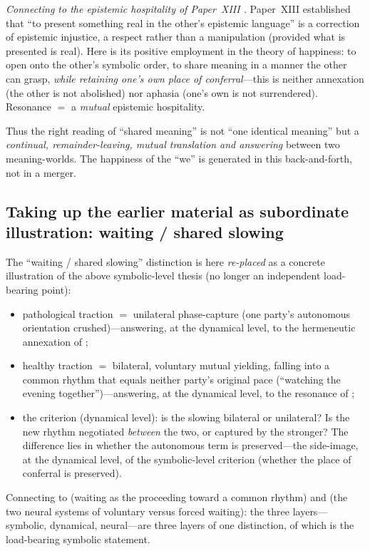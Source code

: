\emph{Connecting to the epistemic hospitality of Paper~XIII \parencite{paperxiii}.} Paper~XIII established that ``to present something real in the other's epistemic language'' is a correction of epistemic injustice, a respect rather than a manipulation (provided what is presented is real). Here is its positive employment in the theory of happiness: to open onto the other's symbolic order, to share meaning in a manner the other can grasp, \emph{while retaining one's own place of conferral}---this is neither annexation (the other is not abolished) nor aphasia (one's own is not surrendered). Resonance $=$ a \emph{mutual} epistemic hospitality.

Thus the right reading of ``shared meaning'' is not ``one identical meaning'' but a \emph{continual, remainder-leaving, mutual translation and answering} between two meaning-worlds. The happiness of the ``we'' is generated in this back-and-forth, not in a merger.

\subsection{Taking up the earlier material as subordinate illustration: waiting / shared slowing}
\label{p19:sub:coex-waiting}

The ``waiting / shared slowing'' distinction is here \emph{re-placed} as a concrete illustration of the above symbolic-level thesis (no longer an independent load-bearing point):
\begin{itemize}
  \item pathological traction $=$ unilateral phase-capture (one party's autonomous orientation crushed)---answering, at the dynamical level, to the hermeneutic annexation of ;
  \item healthy traction $=$ bilateral, voluntary mutual yielding, falling into a common rhythm that equals neither party's original pace (``watching the evening together'')---answering, at the dynamical level, to the resonance of ;
  \item the criterion (dynamical level): is the slowing bilateral or unilateral? Is the new rhythm negotiated \emph{between} the two, or captured by the stronger? The difference lies in whether the autonomous term is preserved---the side-image, at the dynamical level, of the symbolic-level criterion (whether the place of conferral is preserved).
\end{itemize}
Connecting to  (waiting as the proceeding toward a common rhythm) and  (the two neural systems of voluntary versus forced waiting): the three layers---symbolic, dynamical, neural---are three layers of one distinction, of which  is the load-bearing symbolic statement.

